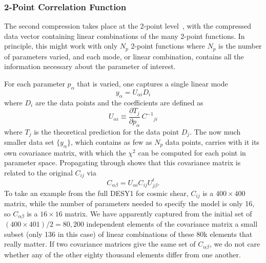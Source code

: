 \documentclass[twocolumn]{\docclass}
\newcommand\be{\begin{equation}}
\newcommand\ee{\end{equation}}
\def\bea{\begin{eqnarray}}
\def\eea{\end{eqnarray}}
\def\svs{\nonumber\\}
\begin{document}

\subsubsection{2-Point Correlation Function}

The second compression takes place at the 2-point level~\citep{Zablocki:2015zcm}, with the compressed data vector containing linear combinations of the many 2-point functions. In principle, this might work with only $N_p$ 2-point functions where $N_p$ is the number of parameters varied, and each mode, or linear combination, contains all the information necessary about the parameter of interest. 

For each parameter $p_\alpha$ that is varied, one captures a single linear mode
\be
y_\alpha = U_{\alpha i} D_i
\ee
where $D_i$ are the data points and the coefficients are defined as
\be \label{eq:compression_scheme}
U_{\alpha i} \equiv \frac{\partial T_j}{\partial p_\alpha} \, C^{-1}{}_{ji}
\ee
where $T_j$ is the theoretical prediction for the data point $D_j$.
The now much smaller data set $\{y_\alpha\}$, which contains as few as $N_p$ data points, carries with it its own covariance matrix, with which the $\chi^2$ can be computed for each point in parameter space. Propagating through shows that this covariance matrix is related to the original $C_{ij}$ via
\be
C_{\alpha\beta} = U_{\alpha i} C_{ij} U^t_{j\beta}.
\ee
To take an example from the full DESY1 for cosmic shear, $C_{ij}$ is a $400 \times 400$ matrix, while the number of parameters needed to specify the model is only 16, so $C_{\alpha\beta}$ is a $16\times 16$ matrix. We have apparently captured from the initial set of $(400 \times 401)/2 = 80,200$ independent elements of the covariance matrix a small subset (only 136 in this case) of linear combinations of these 80k elements that really matter. If two covariance matrices give the same set of $C_{\alpha\beta}$, we do not care whether any of the other eighty thousand elements differ from one another.
\end{document}
